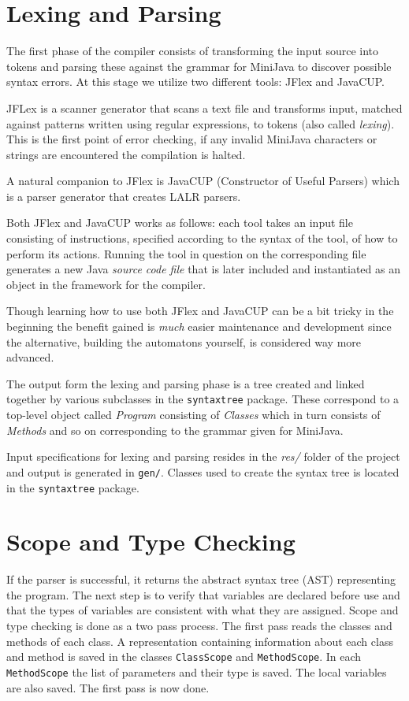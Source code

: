 \documentclass[11pt]{amsart}
\begin{document}
\section{Lexing and Parsing}
The first phase of the compiler consists of transforming the input source into tokens and parsing these against the grammar for MiniJava to discover possible syntax errors. At this stage we utilize two different tools: JFlex and JavaCUP. 

JFLex is a scanner generator that scans a text file and transforms input, matched against patterns written using regular expressions, to tokens (also called \textit{lexing}). This is the first point of error checking, if any invalid MiniJava characters or strings are encountered the compilation is halted.

A natural companion to JFlex is JavaCUP (Constructor of Useful Parsers) which is a parser generator that creates LALR parsers\cite{appel}.

Both JFlex and JavaCUP works as follows: each tool takes an input file consisting of instructions, specified according to the syntax of the tool, of how to perform its actions. Running the tool in question on the corresponding file generates a new Java \textit{source code file} that is later included and instantiated as an object in the framework for the compiler. 

Though learning how to use both JFlex and JavaCUP can be a bit tricky in the beginning the benefit gained is \textit{much} easier maintenance and development since the alternative, building the automatons\cite{automata} yourself, is considered way more advanced.

The output form the lexing and parsing phase is a tree created and linked together by various subclasses in the \texttt{syntaxtree} package. These correspond to a top-level object called \textit{Program} consisting of \textit{Classes} which in turn consists of \textit{Methods} and so on corresponding to the grammar given for MiniJava\cite{grammar}.

Input specifications for lexing and parsing resides in the \textit{res/} folder of the project and output is generated in \texttt{gen/}. Classes used to create the syntax tree is located in the \texttt{syntaxtree} package.

\section{Scope and Type Checking}
If the parser is successful, it returns the abstract syntax tree (AST) representing the program. The next step is to verify that variables are declared before use and that the types of variables are consistent with what they are assigned. Scope and type checking is done as a two pass process. The first pass reads the classes and methods of each class. A representation containing information about each class and method is saved in the classes \texttt{ClassScope} and \texttt{MethodScope}. In each \texttt{MethodScope} the list of parameters and their type is saved. The local variables are also saved. The first pass is now done.
\end{document}

